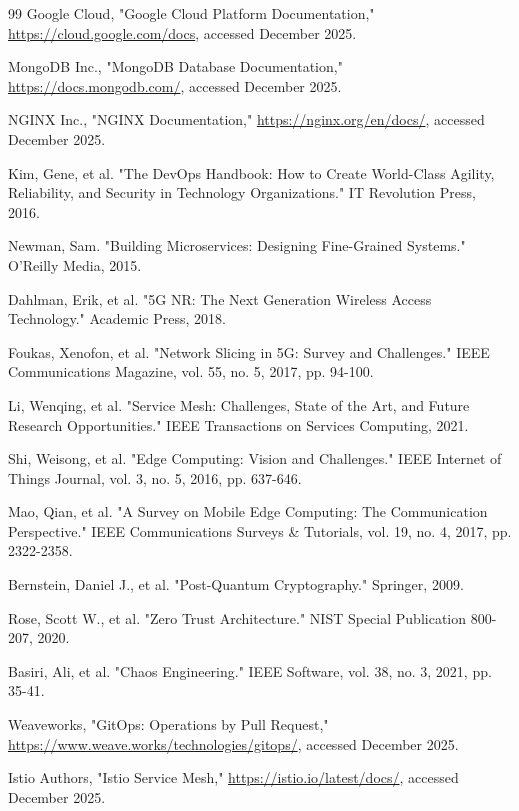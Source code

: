 \documentclass[12pt,a4paper]{report}
\begin{document}
\begin{thebibliography}{99}
 Google Cloud, "Google Cloud Platform Documentation," \url{https://cloud.google.com/docs}, accessed December 2025.

 MongoDB Inc., "MongoDB Database Documentation," \url{https://docs.mongodb.com/}, accessed December 2025.

 NGINX Inc., "NGINX Documentation," \url{https://nginx.org/en/docs/}, accessed December 2025.

 Kim, Gene, et al. "The DevOps Handbook: How to Create World-Class Agility, Reliability, and Security in Technology Organizations." IT Revolution Press, 2016.

 Newman, Sam. "Building Microservices: Designing Fine-Grained Systems." O'Reilly Media, 2015.

 Dahlman, Erik, et al. "5G NR: The Next Generation Wireless Access Technology." Academic Press, 2018.

 Foukas, Xenofon, et al. "Network Slicing in 5G: Survey and Challenges." IEEE Communications Magazine, vol. 55, no. 5, 2017, pp. 94-100.

 Li, Wenqing, et al. "Service Mesh: Challenges, State of the Art, and Future Research Opportunities." IEEE Transactions on Services Computing, 2021.

 Shi, Weisong, et al. "Edge Computing: Vision and Challenges." IEEE Internet of Things Journal, vol. 3, no. 5, 2016, pp. 637-646.

 Mao, Qian, et al. "A Survey on Mobile Edge Computing: The Communication Perspective." IEEE Communications Surveys \& Tutorials, vol. 19, no. 4, 2017, pp. 2322-2358.

 Bernstein, Daniel J., et al. "Post-Quantum Cryptography." Springer, 2009.

 Rose, Scott W., et al. "Zero Trust Architecture." NIST Special Publication 800-207, 2020.

 Basiri, Ali, et al. "Chaos Engineering." IEEE Software, vol. 38, no. 3, 2021, pp. 35-41.

 Weaveworks, "GitOps: Operations by Pull Request," \url{https://www.weave.works/technologies/gitops/}, accessed December 2025.

 Istio Authors, "Istio Service Mesh," \url{https://istio.io/latest/docs/}, accessed December 2025.


\end{thebibliography}
\end{document}

